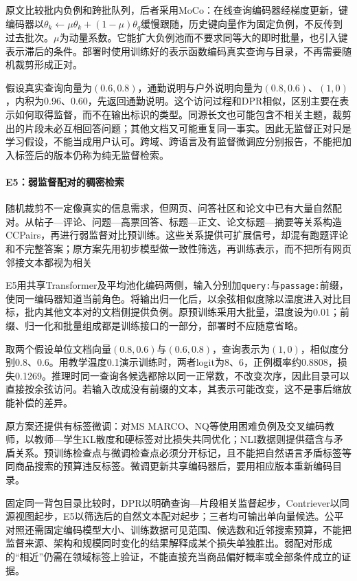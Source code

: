 原文比较批内负例和跨批队列，后者采用MoCo：在线查询编码器经梯度更新，键编码器以$\theta_k\leftarrow\mu\theta_k+(1-\mu)\theta_q$缓慢跟随，历史键向量作为固定负例，不反传到过去批次。$\mu$为动量系数。它能扩大负例池而不要求同等大的即时批量，也引入键表示滞后的条件。部署时使用训练好的表示函数编码真实查询与目录，不再需要随机裁剪形成正对。

假设真实查询向量为$(0.6,0.8)$，通勤说明与户外说明向量为$(0.8,0.6)$、$(1,0)$，内积为0.96、0.60，先返回通勤说明。这个访问过程和DPR相似，区别主要在表示如何取得监督，而不在输出标识的类型。同源长文也可能包含不相关主题，裁剪出的片段未必互相回答问题；其他文档又可能重复同一事实。因此无监督正对只是学习假设，不能当成用户认可。跨域、跨语言及有监督微调应分别报告，不能把加入标签后的版本仍称为纯无监督检索。

\Needspace{100mm}
\paragraph{E5：弱监督配对的稠密检索}
\label{sec:rs-search-e5}

随机裁剪不一定像真实的信息需求，但网页、问答社区和论文中已有大量自然配对。从帖子—评论、问题—高票回答、标题—正文、论文标题—摘要等关系构造CCPairs，再进行弱监督对比预训练。这些关系提供可扩展信号，却混有跑题评论和不完整答案；原方案先用初步模型做一致性筛选，再训练表示，而不把所有网页邻接文本都视为相关

E5用共享Transformer及平均池化编码两侧，输入分别加\texttt{query:}与\texttt{passage:}前缀，使同一编码器知道当前角色。将输出归一化后，以余弦相似度除以温度进入对比目标，批内其他文本对的文档侧提供负例。原预训练采用大批量，温度设为0.01；前缀、归一化和批量组成都是训练接口的一部分，部署时不应随意省略。

取两个假设单位文档向量$(0.8,0.6)$与$(0.6,0.8)$，查询表示为$(1,0)$，相似度分别0.8、0.6。用教学温度0.1演示训练时，两者logit为8、6，正例概率约0.8808，损失0.1269。推理时同一查询各候选都除以同一正常数，不改变次序，因此目录可以直接按余弦访问。若输入改成没有前缀的文本，其表示可能改变，这不是事后缩放能补偿的差异。

原方案还提供有标签微调：对MS MARCO、NQ等使用困难负例及交叉编码教师，以教师—学生KL散度和硬标签对比损失共同优化；NLI数据则提供蕴含与矛盾关系。预训练检查点与微调检查点必须分开标记，且不能把自然语言矛盾标签等同商品搜索的预算违反标签。微调更新共享编码器后，要用相应版本重新编码目录。

固定同一背包目录比较时，DPR以明确查询—片段相关监督起步，Contriever以同源视图起步，E5以筛选后的自然文本配对起步；三者均可输出单向量候选。公平对照还需固定编码模型大小、训练数据可见范围、候选数和近邻搜索预算，不能把监督来源、架构和规模同时变化的结果解释成某个损失单独胜出。弱配对形成的“相近”仍需在领域标签上验证，不能直接充当商品偏好概率或全部条件成立的证据。

